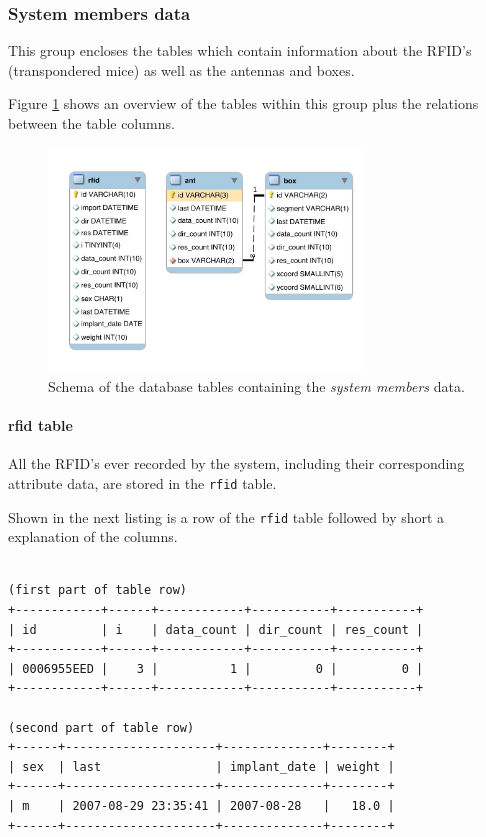 \subsubsection{System members data}
\label{subsubsec:system_members_tables}

This group encloses the tables which contain information about the RFID's (transpondered mice) as well as the antennas and boxes.

Figure \ref{fig:system_members} shows an overview of the tables within this group plus the relations between the table columns. 

\begin{figure}[htpb]
\begin{center}
  \includegraphics[width=0.75\textwidth]{assets/pdf/system_members_schema.pdf}
  \caption[Schema of database tables with system member data]{Schema of the database tables containing the \textit{system members} data.}
  \label{fig:system_members}
\end{center}
\end{figure}

\paragraph{rfid table}
\label{para:rfid_table}

All the RFID's ever recorded by the system, including their corresponding attribute data, are stored in the \lstinline|rfid| table.

Shown in the next listing is a row of the \lstinline|rfid| table followed by short a explanation of the columns.
\codescript
{}
\begin{lstlisting}[frame=none]

(first part of table row)
+------------+------+------------+-----------+-----------+
| id         | i    | data_count | dir_count | res_count |
+------------+------+------------+-----------+-----------+
| 0006955EED |    3 |          1 |         0 |         0 |
+------------+------+------------+-----------+-----------+

(second part of table row)
+------+---------------------+--------------+--------+
| sex  | last                | implant_date | weight |
+------+---------------------+--------------+--------+
| m    | 2007-08-29 23:35:41 | 2007-08-28   |   18.0 |
+------+---------------------+--------------+--------+

\end{lstlisting}

